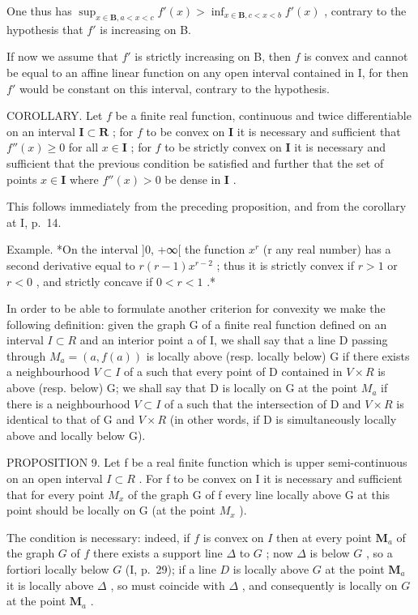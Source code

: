 One thus has \(\sup_{x\in \mathbf{B},a < x < c}f'(x) > \inf_{x\in \mathbf{B},c < x < b}f'(x)\) , contrary to the hypothesis that \(f'\) is increasing on B.

If now we assume that \(f'\) is strictly increasing on B, then \(f\) is convex and cannot be equal to an affine linear function on any open interval contained in I, for then \(f'\) would be constant on this interval, contrary to the hypothesis.

COROLLARY. Let \(f\) be a finite real function, continuous and twice differentiable on an interval \(\mathbf{I} \subset \mathbf{R}\) ; for \(f\) to be convex on \(\mathbf{I}\) it is necessary and sufficient that \(f''(x) \geqslant 0\) for all \(x \in \mathbf{I}\) ; for \(f\) to be strictly convex on \(\mathbf{I}\) it is necessary and sufficient that the previous condition be satisfied and further that the set of points \(x \in \mathbf{I}\) where \(f''(x) > 0\) be dense in \(\mathbf{I}\) .

This follows immediately from the preceding proposition, and from the corollary at I, p.~14.

Example. *On the interval {]}0, +∞{[} the function \(x^r\) (r any real number) has a second derivative equal to \(r(r - 1)x^{r - 2}\) ; thus it is strictly convex if \(r > 1\) or \(r < 0\) , and strictly concave if \(0 < r < 1\) .*

In order to be able to formulate another criterion for convexity we make the following definition: given the graph G of a finite real function defined on an interval \(I \subset R\) and an interior point a of I, we shall say that a line D passing through \(M_{a} = (a, f(a))\) is locally above (resp. locally below) G if there exists a neighbourhood \(V \subset I\) of a such that every point of D contained in \(V \times R\) is above (resp. below) G; we shall say that D is locally on G at the point \(M_{a}\) if there is a neighbourhood \(V \subset I\) of a such that the intersection of D and \(V \times R\) is identical to that of G and \(V \times R\) (in other words, if D is simultaneously locally above and locally below G).

PROPOSITION 9. Let f be a real finite function which is upper semi-continuous on an open interval \(I \subset R\) . For f to be convex on I it is necessary and sufficient that for every point \(M_{x}\) of the graph G of f every line locally above G at this point should be locally on G (at the point \(M_{x}\) ).

The condition is necessary: indeed, if \(f\) is convex on \(I\) then at every point \(\mathbf{M}_a\) of the graph \(G\) of \(f\) there exists a support line \(\Delta\) to \(G\) ; now \(\Delta\) is below \(G\) , so a fortiori locally below \(G\) (I, p.~29); if a line \(D\) is locally above \(G\) at the point \(\mathbf{M}_a\) it is locally above \(\Delta\) , so must coincide with \(\Delta\) , and consequently is locally on \(G\) at the point \(\mathbf{M}_a\) .

